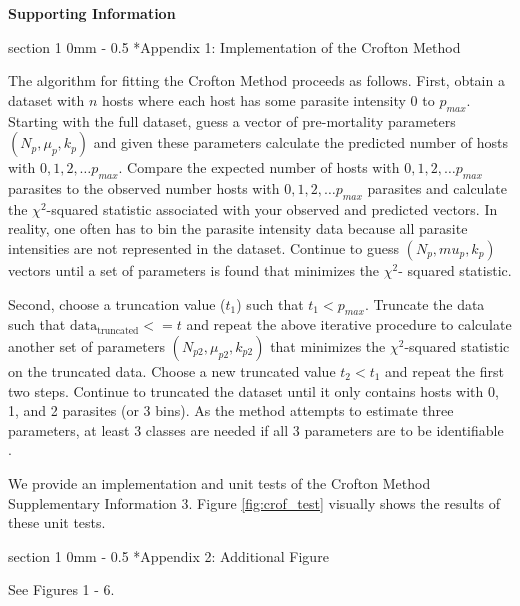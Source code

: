 \documentclass[12pt, a4paper]{article}
\makeatletter
\renewcommand{\section}{\@startsection
{section}%
{1}%
{0mm}%
{-\baselineskip}%
{0.5\baselineskip}%
{\normalfont\bf\large}} %
\makeatother
\begin{document}
\linenumbers

\doublespacing

\noindent
\Large{\textbf{Supporting Information}}

\normalsize

\section*{Appendix 1: Implementation of the Crofton Method}

The algorithm for fitting the Crofton Method \citep{Crofton1971a} proceeds as follows. First, obtain a dataset
with $n$ hosts where each host has some parasite intensity 0 to $p_{max}$. Starting
with the full dataset, guess a vector of pre-mortality parameters $(N_p, \mu_p, k_p)$ and given
these parameters calculate the predicted number of hosts with $0, 1, 2, \dots
p_{max}$.  Compare the expected number of hosts with $0, 1, 2, \dots  p_{max}$ parasites
to the observed number hosts with $0, 1, 2, \dots p_{max}$ parasites and calculate
the $\chi^2$-squared statistic associated with your observed and predicted vectors. In reality, one often has to bin the parasite intensity data because all
parasite intensities are not represented in the dataset. Continue to guess $(N_p,
mu_p, k_p)$ vectors until a set of parameters is found that minimizes the $\chi^2$-
squared statistic.

Second, choose a truncation value ($t_1$) such that $t_1 <
p_{max}$. Truncate the data such that $\text{data}_\text{truncated} <= t$ and repeat the above
iterative procedure to calculate another set of parameters $(N_{p2}, \mu_{p2}, k_{p2})$
that minimizes the $\chi^2$-squared statistic on the truncated data. Choose a new
truncated value $t_2 < t_1$ and repeat the first two steps. Continue to truncated
the dataset until it only contains hosts with 0, 1, and 2 parasites (or 3 bins).
As the method attempts to estimate three parameters, at least 3 classes are
needed if all 3 parameters are to be identifiable \citep{Royce1990}.

We provide an implementation and unit tests of the Crofton Method Supplementary Information 3.  Figure \ref{fig:crof_test} visually shows the results of these unit tests.

\section*{Appendix 2: Additional Figure}

See Figures 1 - 6.
\end{document}
